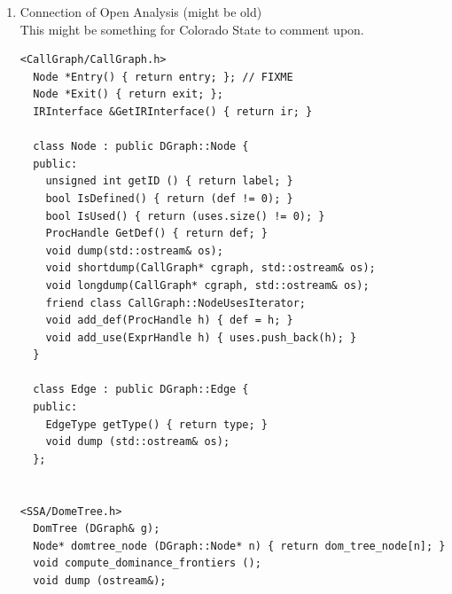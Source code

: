 \begin{enumerate}
\begin{enumerate}
\begin{lstlisting}
<DominatorTree.h>
  DominatorTree(SgNode * head, Direction d = PRE);
  //! get the CFG the dominator tree is built from
  ControlFlowGraph * getCFG() {return _cfg;}
  //! returns whether this is a dominator tree (PRE) or a post-dominator tree (POST)
  Direction getDirection() {return _dir;}
  //! returns the corresponding direction for the numbering of the CFG.
  ControlFlowGraph::ID_dir getCFGDirection() {return _iddir;}
  //! returns the number of nodes in the tree
  int getSize() {return _size;}
  //! for a given node, return the id of its immediate dominator
  int getDom(ControlNode * node) {return doms[node->getID(_iddir)];}
  //! for a given node id, return the id of its immediate dominator
  int getDom(int id) {return doms[id];}
  void printCFG();
  void printDominators();

<DominanceFrontier.h>
  DominanceFrontier(DominatorTree * dt) : _dt(dt),
					  _size(_dt->getSize()),
					  _domFrontier(new std::set<int>[_size])
  /*! get the dominance frontier for a given node (these need to be
  referenced against the CFG to determine the actual nodes in the
  frontier
  */
  std::set<int> getFrontier(int id) {return _domFrontier[id];}
  void printFrontier();
      \end{lstlisting}


      \item Connection of Open Analysis (might be old) \\
      This might be something for Colorado State to comment upon.
      \begin{lstlisting}
<CallGraph/CallGraph.h>
  Node *Entry() { return entry; }; // FIXME
  Node *Exit() { return exit; };
  IRInterface &GetIRInterface() { return ir; }

  class Node : public DGraph::Node {
  public:
    unsigned int getID () { return label; }
    bool IsDefined() { return (def != 0); }
    bool IsUsed() { return (uses.size() != 0); }
    ProcHandle GetDef() { return def; }
    void dump(std::ostream& os);
    void shortdump(CallGraph* cgraph, std::ostream& os);
    void longdump(CallGraph* cgraph, std::ostream& os);
    friend class CallGraph::NodeUsesIterator;
    void add_def(ProcHandle h) { def = h; }
    void add_use(ExprHandle h) { uses.push_back(h); }
  }

  class Edge : public DGraph::Edge {
  public:
    EdgeType getType() { return type; }
    void dump (std::ostream& os);
  };  


<SSA/DomeTree.h>
  DomTree (DGraph& g);
  Node* domtree_node (DGraph::Node* n) { return dom_tree_node[n]; }
  void compute_dominance_frontiers ();
  void dump (ostream&);


\end{lstlisting}
\end{enumerate}
\end{enumerate}
